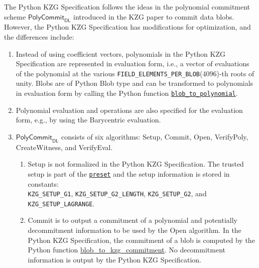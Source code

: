 \documentclass[12pt]{galois-whitepaper}
\begin{document}
The Python KZG Specification follows the ideas in the polynomial commitment scheme $\textsf{PolyCommit}_{\textsf{DL}}$ introduced in the KZG paper to commit data blobs.
However, the Python KZG Specification has modifications for optimization, and the differences include:
\begin{enumerate}
    \item Instead of using coefficient vectors, polynomials in the Python KZG Specification are represented in evaluation form, i.e., a vector of evaluations of the polynomial at the various \texttt{FIELD\_ELEMENTS\_PER\_BLOB}(4096)-th roots of unity.
    Blobs are of Python Blob type and can be transformed to polynomials in evaluation form by calling the Python function \href{https://github.com/ethereum/consensus-specs/blob/dev/specs/deneb/polynomial-commitments.md\#blob_to_polynomial}{\texttt{blob\_to\_polynomial}}.

    \item Polynomial evaluation and operations are also specified for the evaluation form, e.g., by using the Barycentric evaluation.

    \item $\textsf{PolyCommit}_{\textsf{DL}}$ consists of six algorithms: \textsf{Setup}, \textsf{Commit}, \textsf{Open}, \textsf{VerifyPoly}, \textsf{CreateWitness}, and \textsf{VerifyEval}.

    \begin{enumerate}

    \item \textsf{Setup} is not formalized in the Python KZG Specification.
    The trusted setup is part of the \href{https://github.com/ethereum/consensus-specs/blob/dev/specs/deneb/polynomial-commitments.md#verify_kzg_proof_batch}{\texttt{preset}}
    and the setup information is stored in constants:
    \\\texttt{KZG\_SETUP\_G1},
    \texttt{KZG\_SETUP\_G2\_LENGTH},
    \texttt{KZG\_SETUP\_G2},
    and \texttt{KZG\_SETUP\_LAGRANGE}.

    \item \textsf{Commit} is to output a commitment of a polynomial and potentially decommitment information to be used by the \textsf{Open} algorithm.
    In the Python KZG Specification,
    the commitment of a blob is computed by the Python function \href{https://github.com/ethereum/consensus-specs/blob/dev/specs/deneb/polynomial-commitments.md\#blob_to_kzg_commitment}{blob\_to\_kzg\_commitment}.
    No decommitment information is output by the Python KZG Specification.


\end{enumerate}
\end{enumerate}
\end{document}
